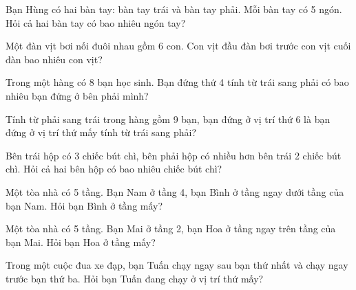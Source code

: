 \begin{ex}
Bạn Hùng có hai bàn tay: bàn tay trái và bàn tay phải. Mỗi bàn tay có 5 ngón. Hỏi cả hai bàn tay có bao nhiêu ngón tay?
\end{ex}

\begin{ex}
Một đàn vịt bơi nối đuôi nhau gồm 6 con. Con vịt đầu đàn bơi trước con vịt cuối đàn bao nhiêu con vịt?
\end{ex}

\begin{ex}
Trong một hàng có 8 bạn học sinh. Bạn đứng thứ 4 tính từ trái sang phải có bao nhiêu bạn đứng ở bên phải mình?
\end{ex}

\begin{ex}
Tính từ phải sang trái trong hàng gồm 9 bạn, bạn đứng ở vị trí thứ 6 là bạn đứng ở vị trí thứ mấy tính từ trái sang phải?
\end{ex}

\begin{ex}
Bên trái hộp có 3 chiếc bút chì, bên phải hộp có nhiều hơn bên trái 2 chiếc bút chì. Hỏi cả hai bên hộp có bao nhiêu chiếc bút chì?
\end{ex}

\begin{ex}
Một tòa nhà có 5 tầng. Bạn Nam ở tầng 4, bạn Bình ở tầng ngay dưới tầng của bạn Nam. Hỏi bạn Bình ở tầng mấy?
\end{ex}

\begin{ex}
Một tòa nhà có 5 tầng. Bạn Mai ở tầng 2, bạn Hoa ở tầng ngay trên tầng của bạn Mai. Hỏi bạn Hoa ở tầng mấy?
\end{ex}

\begin{ex}
Trong một cuộc đua xe đạp, bạn Tuấn chạy ngay sau bạn thứ nhất và chạy ngay trước bạn thứ ba. Hỏi bạn Tuấn đang chạy ở vị trí thứ mấy?
\end{ex}

